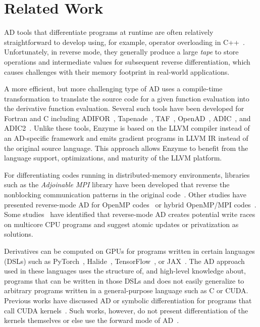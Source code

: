 \section{Related Work}
\label{sec:related}

AD tools that differentiate programs at runtime are often relatively straightforward to develop using, for example, operator overloading in C++~\cite{griewank1996algorithm,lotz2011dco,Walther2012Gsw,bell2012cppad,hogan2014fast,sagebaum2019high}. Unfortunately, in reverse mode, they generally produce a large {\em tape} to store operations and intermediate values for subsequent reverse differentiation, which causes challenges with their memory footprint in real-world applications.


A more efficient, but more challenging type of AD uses a compile-time transformation to translate the source code for a given function evaluation
into the derivative function evaluation. Several such tools have been developed for Fortran and C including ADIFOR~\cite{bischof1996adifor}, Tapenade~\cite{TapenadeRef13}, TAF~\cite{GIERING20051345}, OpenAD~\cite{Utke2008OAM}, ADIC~\cite{bischof1997adic}, and ADIC2~\cite{NARAYANAN20101845}.
Unlike these tools, Enzyme is based on the LLVM compiler instead of an AD-specific framework and emits gradient programs in LLVM IR instead of the original source language. This approach allows Enzyme to benefit from the language support, optimizations, and maturity of the LLVM platform.

For differentiating codes running in distributed-memory environments, 
libraries such as the \emph{Adjoinable MPI} library have been developed that reverse the nonblocking communication patterns in the original code~\cite{5161165,CARDESA2020101155}. Other studies have presented reverse-mode AD for OpenMP codes~\cite{Bischof2008PRM,Bucker2001BTA,Bucker2002ELS,forster2014algorithmic,doi:10.1177/1094342017712060,tfmad} or hybrid OpenMP/\-MPI codes~\cite{Giering2005TLa}.
Some studies~\cite{Giering2005TLa, Bischof2008PRM} have identified that reverse-mode AD creates potential write races on multicore CPU programs and suggest atomic updates or privatization as solutions.

Derivatives can be computed on GPUs for programs written in certain  languages (DSLs) such as PyTorch~\cite{paszke2017automatic},  Halide~\cite{halide}, TensorFlow~\cite{tensorflow2015-whitepaper}, or JAX~\cite{bradbury2020jax}. The AD approach used in these languages uses the structure of, and high-level knowledge about, programs that can be written in those DSLs and does not easily generalize to arbitrary programs written in a general-purpose language such as C or CUDA. Previous works have discussed AD or symbolic differentiation for programs that call CUDA kernels~\cite{Grabner2008ADf,gremse2016gpu}. Such works, however, do not present differentiation of the kernels themselves or else use the forward mode of AD~\cite{blhdorn2020automat, revels2018-mixedmode}.
